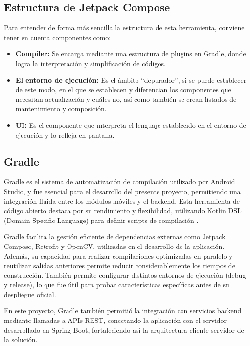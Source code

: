\subsection*{Estructura de Jetpack Compose}
Para entender de forma más sencilla la estructura de esta herramienta, conviene tener en cuenta componentes como:
\begin{itemize}
	\item \textbf{Compiler:} Se encarga mediante una estructura de plugins en Gradle, donde logra la interpretación y simplificación de códigos.
	\item \textbf{El entorno de ejecución:} Es el ámbito “depurador”, si se puede establecer de este modo, en el que se establecen y diferencian los componentes que necesitan actualización y cuáles no, así como también se crean listados de mantenimiento y composición.
	\item \textbf{UI:} Es el componente que interpreta el lenguaje establecido en el entorno de ejecución y lo refleja en pantalla.
\end{itemize}

\subsection{Gradle}

\begin{list}{}%
	{\setlength{\leftmargin}{1cm}\setlength{\rightmargin}{1cm}}
	\item\relax
	\small
	
	Gradle es el sistema de automatización de compilación utilizado por Android Studio, y fue esencial para el desarrollo del presente proyecto, permitiendo una integración fluida entre los módulos móviles y el backend. Esta herramienta de código abierto destaca por su rendimiento y flexibilidad, utilizando Kotlin DSL (Domain Specific Language) para definir scripts de compilación \cite{CitaD20}. 
	
	Gradle facilita la gestión eficiente de dependencias externas como Jetpack Compose, Retrofit y OpenCV, utilizadas en el desarrollo de la aplicación. Además, su capacidad para realizar compilaciones optimizadas en paralelo y reutilizar salidas anteriores permite reducir considerablemente los tiempos de construcción. También permite configurar distintos entornos de ejecución (debug y release), lo que fue útil para probar características específicas antes de su despliegue oficial. 
	
	En este proyecto, Gradle también permitió la integración con servicios backend mediante llamadas a APIs REST, conectando la aplicación con el servidor desarrollado en Spring Boot, fortaleciendo así la arquitectura cliente-servidor de la solución.
	
\end{list}


